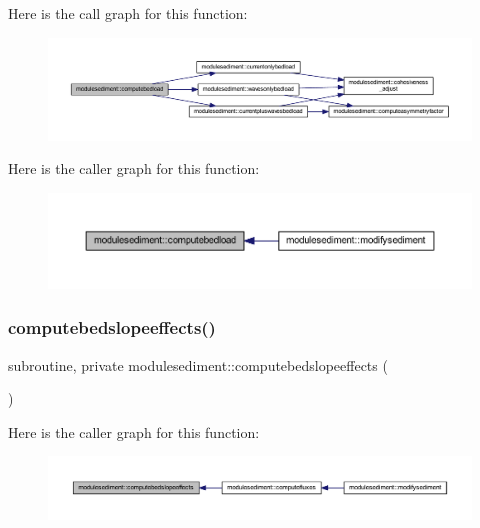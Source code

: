 Here is the call graph for this function\+:\nopagebreak
\begin{figure}[H]
\begin{center}
\leavevmode
\includegraphics[width=350pt]{namespacemodulesediment_a621ed127ad378409a67e67c54993d3cb_cgraph}
\end{center}
\end{figure}
Here is the caller graph for this function\+:\nopagebreak
\begin{figure}[H]
\begin{center}
\leavevmode
\includegraphics[width=350pt]{namespacemodulesediment_a621ed127ad378409a67e67c54993d3cb_icgraph}
\end{center}
\end{figure}
\mbox{\label{namespacemodulesediment_ab31a25d99dffd49784478e26814bbea5}} 
\subsubsection{\texorpdfstring{computebedslopeeffects()}{computebedslopeeffects()}}
{\footnotesize\ttfamily subroutine, private modulesediment\+::computebedslopeeffects (\begin{DoxyParamCaption}{ }\end{DoxyParamCaption})\hspace{0.3cm}{\ttfamily [private]}}

Here is the caller graph for this function\+:\nopagebreak
\begin{figure}[H]
\begin{center}
\leavevmode
\includegraphics[width=350pt]{namespacemodulesediment_ab31a25d99dffd49784478e26814bbea5_icgraph}
\end{center}
\end{figure}
\mbox{\label{namespacemodulesediment_a513f33f980769b37c74ea34212fad388}} 
